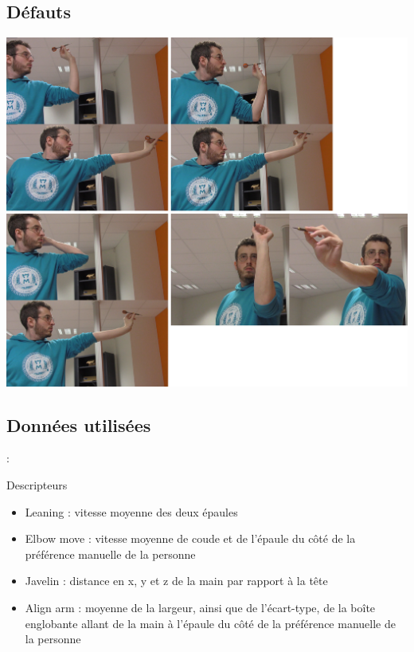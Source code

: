 \documentclass[svgnames]{beamer}
\begin{document}
	\subsection{Défauts}
	\begin{frame}{\subsecname}
		\centering
		\includegraphics[scale=0.3]{img/all_defaults.png}
	\end{frame}
	
	\subsection{Données utilisées}
	\begin{frame}{\secname : \subsecname}
		\begin{block}{Descripteurs}
			\begin{itemize}[label=$\bullet$]
				\item Leaning : vitesse moyenne des deux épaules
				\item Elbow move : vitesse moyenne de coude et de l'épaule du côté de la préférence manuelle de la personne
				\item Javelin : distance en x, y et z de la main par rapport à la tête
				\item Align arm : moyenne de la largeur, ainsi que de l'écart-type, de la boîte englobante allant de la main à l'épaule du côté de la préférence manuelle de la personne
			\end{itemize}
		\end{block}
	\end{frame}
	
\end{document}
